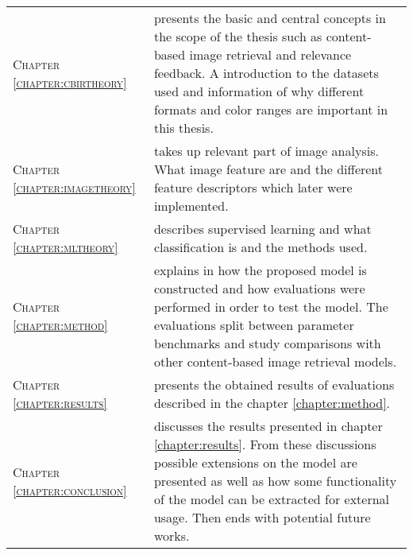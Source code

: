 \begin{tabular}{l p{}}
\textsc{Chapter \ref{chapter:cbirtheory}} & \textbf{\nameref{chapter:cbirtheory}} 
presents the basic and central concepts in the scope of the thesis such as content-based image retrieval and relevance feedback. A introduction to the datasets used and information of why different formats and color ranges are important in this thesis.\\ 
\textsc{Chapter \ref{chapter:imagetheory}} & \textbf{\nameref{chapter:imagetheory}}
takes up relevant part of image analysis. What image feature are and the different feature descriptors which later were implemented.\\ 
\textsc{Chapter \ref{chapter:mltheory}} & \textbf{\nameref{chapter:mltheory}}
describes supervised learning and what classification is and the methods used. \\ 
\textsc{Chapter \ref{chapter:method}} & \textbf{\nameref{chapter:method}}
explains in how the proposed model is constructed and how evaluations were performed in order to test the model. The evaluations split between parameter benchmarks and study comparisons with other content-based image retrieval models.\\ 
\textsc{Chapter \ref{chapter:results}} & \textbf{\nameref{chapter:results}}
presents the obtained results of evaluations described in the chapter \ref{chapter:method}. \\ 
\textsc{Chapter \ref{chapter:conclusion}} & \textbf{\nameref{chapter:conclusion}}
discusses the results presented in chapter \ref{chapter:results}. From these discussions possible extensions on the model are presented as well as how some functionality of the model can be extracted for external usage. Then ends with potential future works. \\ 
\end{tabular}

